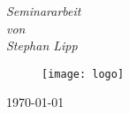 \begin{titlepage}
	
	{\large \textit{Seminararbeit}}\\[1mm]
	\textit{von}\\[1mm]
	{\large \textit{Stephan Lipp}}
	
	
	\vfill\vfill\vfill %

	\begin{figure}[!h]
		\centering
		\texttt{[image: logo]}
	\end{figure}
	
	\vfill

	{\large\today} %
	
	
	 
	
	\vfill %
	
\end{titlepage}